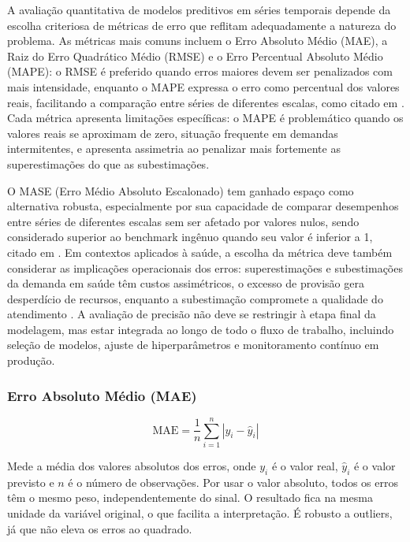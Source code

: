 \documentclass[
    12pt,                %
    openright,           %
    oneside,             %
    a4paper,             %
    english,             %
    brazil               %
]{abntex2}
\begin{document}
A avaliação quantitativa de modelos preditivos em séries temporais depende da escolha criteriosa de métricas de erro que reflitam adequadamente a natureza do problema. As métricas mais comuns incluem o Erro Absoluto Médio (MAE), a Raiz do Erro Quadrático Médio (RMSE) e o Erro Percentual Absoluto Médio (MAPE): o RMSE é preferido quando erros maiores devem ser penalizados com mais intensidade, enquanto o MAPE expressa o erro como percentual dos valores reais, facilitando a comparação entre séries de diferentes escalas, como citado em . Cada métrica apresenta limitações específicas: o MAPE é problemático quando os valores reais se aproximam de zero, situação frequente em demandas intermitentes, e apresenta assimetria ao penalizar mais fortemente as superestimações do que as subestimações.

O MASE (Erro Médio Absoluto Escalonado) tem ganhado espaço como alternativa robusta, especialmente por sua capacidade de comparar desempenhos entre séries de diferentes escalas sem ser afetado por valores nulos, sendo considerado superior ao benchmark ingênuo quando seu valor é inferior a 1, citado em . Em contextos aplicados à saúde, a escolha da métrica deve também considerar as implicações operacionais dos erros: superestimações e subestimações da demanda em saúde têm custos assimétricos, o excesso de provisão gera desperdício de recursos, enquanto a subestimação compromete a qualidade do atendimento . A avaliação de precisão não deve se restringir à etapa final da modelagem, mas estar integrada ao longo de todo o fluxo de trabalho, incluindo seleção de modelos, ajuste de hiperparâmetros e monitoramento contínuo em produção.

\subsubsection{Erro Absoluto Médio (MAE)}
\label{subsec:mae}

\begin{equation}
\text{MAE} = \frac{1}{n}\sum_{i=1}^{n}\left|y_i - \hat{y}_i\right|
\end{equation}

Mede a média dos valores absolutos dos erros, onde $y_i$ é o valor real, $\hat{y}_i$ é o valor previsto e $n$ é o número de observações. Por usar o valor absoluto, todos os erros têm o mesmo peso, independentemente do sinal. O resultado fica na mesma unidade da variável original, o que facilita a interpretação. É robusto a outliers, já que não eleva os erros ao quadrado.
\end{document}

